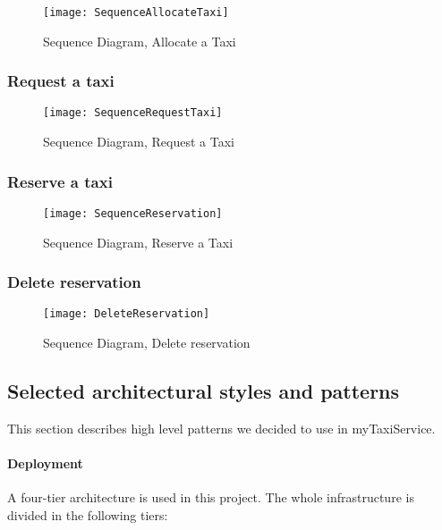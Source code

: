 \begin{figure}[H]
    \centering
    \texttt{[image: SequenceAllocateTaxi]}
    \caption{Sequence Diagram, Allocate a Taxi}
    \label{fig:allocate}
\end{figure}

\subsubsection{Request a taxi} %
\label{ssec:request}
\begin{figure}[H]
    \centering
    \texttt{[image: SequenceRequestTaxi]}
    \caption{Sequence Diagram, Request a Taxi}
    \label{fig:request}
\end{figure}

\subsubsection{Reserve a taxi} %
\label{ssec:reserve}
\begin{figure}[H]
    \centering
    \texttt{[image: SequenceReservation]}
    \caption{Sequence Diagram, Reserve a Taxi}
    \label{fig:reserve}
\end{figure}

\subsubsection{Delete reservation} %
\label{ssec:delete}
\begin{figure}[H]
    \centering
    \texttt{[image: DeleteReservation]}
    \caption{Sequence Diagram, Delete reservation}
    \label{fig:delete}
\end{figure}

\pagebreak
\subsection{Selected architectural styles and patterns}
This section describes high level patterns we decided to use in myTaxiService.

\paragraph{Deployment} A four-tier architecture is used in this project.
The whole infrastructure is divided in the following tiers:

